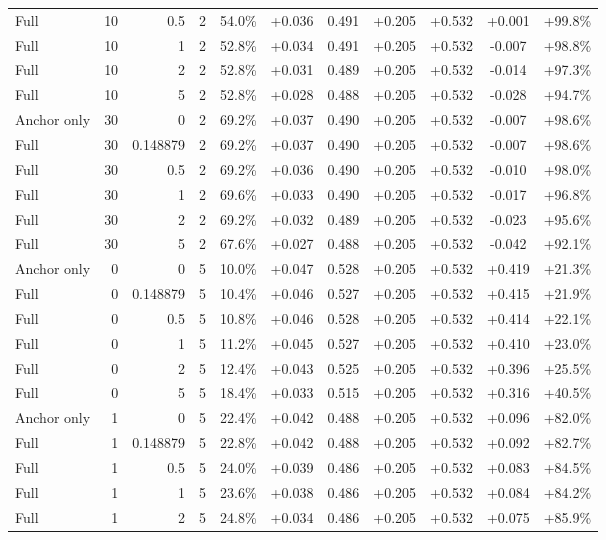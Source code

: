 \begin{table}[htbp]
\begin{tabular}{lrrrccccccc}
Full & 10 & 0.5 & 2 & 54.0\% & +0.036 & 0.491 & +0.205 & +0.532 & +0.001 & +99.8\% \\
Full & 10 & 1 & 2 & 52.8\% & +0.034 & 0.491 & +0.205 & +0.532 & -0.007 & +98.8\% \\
Full & 10 & 2 & 2 & 52.8\% & +0.031 & 0.489 & +0.205 & +0.532 & -0.014 & +97.3\% \\
Full & 10 & 5 & 2 & 52.8\% & +0.028 & 0.488 & +0.205 & +0.532 & -0.028 & +94.7\% \\
Anchor only & 30 & 0 & 2 & 69.2\% & +0.037 & 0.490 & +0.205 & +0.532 & -0.007 & +98.6\% \\
Full & 30 & 0.148879 & 2 & 69.2\% & +0.037 & 0.490 & +0.205 & +0.532 & -0.007 & +98.6\% \\
Full & 30 & 0.5 & 2 & 69.2\% & +0.036 & 0.490 & +0.205 & +0.532 & -0.010 & +98.0\% \\
Full & 30 & 1 & 2 & 69.6\% & +0.033 & 0.490 & +0.205 & +0.532 & -0.017 & +96.8\% \\
Full & 30 & 2 & 2 & 69.2\% & +0.032 & 0.489 & +0.205 & +0.532 & -0.023 & +95.6\% \\
Full & 30 & 5 & 2 & 67.6\% & +0.027 & 0.488 & +0.205 & +0.532 & -0.042 & +92.1\% \\
Anchor only & 0 & 0 & 5 & 10.0\% & +0.047 & 0.528 & +0.205 & +0.532 & +0.419 & +21.3\% \\
Full & 0 & 0.148879 & 5 & 10.4\% & +0.046 & 0.527 & +0.205 & +0.532 & +0.415 & +21.9\% \\
Full & 0 & 0.5 & 5 & 10.8\% & +0.046 & 0.528 & +0.205 & +0.532 & +0.414 & +22.1\% \\
Full & 0 & 1 & 5 & 11.2\% & +0.045 & 0.527 & +0.205 & +0.532 & +0.410 & +23.0\% \\
Full & 0 & 2 & 5 & 12.4\% & +0.043 & 0.525 & +0.205 & +0.532 & +0.396 & +25.5\% \\
Full & 0 & 5 & 5 & 18.4\% & +0.033 & 0.515 & +0.205 & +0.532 & +0.316 & +40.5\% \\
Anchor only & 1 & 0 & 5 & 22.4\% & +0.042 & 0.488 & +0.205 & +0.532 & +0.096 & +82.0\% \\
Full & 1 & 0.148879 & 5 & 22.8\% & +0.042 & 0.488 & +0.205 & +0.532 & +0.092 & +82.7\% \\
Full & 1 & 0.5 & 5 & 24.0\% & +0.039 & 0.486 & +0.205 & +0.532 & +0.083 & +84.5\% \\
Full & 1 & 1 & 5 & 23.6\% & +0.038 & 0.486 & +0.205 & +0.532 & +0.084 & +84.2\% \\
Full & 1 & 2 & 5 & 24.8\% & +0.034 & 0.486 & +0.205 & +0.532 & +0.075 & +85.9\% \\

\end{tabular}
\end{table}
